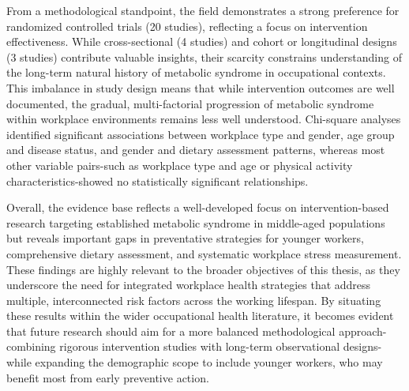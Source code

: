 From a methodological standpoint, the field demonstrates a strong preference for randomized controlled trials (20 studies), reflecting a focus on intervention effectiveness. While cross-sectional (4 studies) and cohort or longitudinal designs (3 studies) contribute valuable insights, their scarcity constrains understanding of the long-term natural history of metabolic syndrome in occupational contexts. This imbalance in study design means that while intervention outcomes are well documented, the gradual, multi-factorial progression of metabolic syndrome within workplace environments remains less well understood. Chi-square analyses identified significant associations between workplace type and gender, age group and disease status, and gender and dietary assessment patterns, whereas most other variable pairs-such as workplace type and age or physical activity characteristics-showed no statistically significant relationships.\par
Overall, the evidence base reflects a well-developed focus on intervention-based research targeting established metabolic syndrome in middle-aged populations but reveals important gaps in preventative strategies for younger workers, comprehensive dietary assessment, and systematic workplace stress measurement. These findings are highly relevant to the broader objectives of this thesis, as they underscore the need for integrated workplace health strategies that address multiple, interconnected risk factors across the working lifespan. By situating these results within the wider occupational health literature, it becomes evident that future research should aim for a more balanced methodological approach-combining rigorous intervention studies with long-term observational designs-while expanding the demographic scope to include younger workers, who may benefit most from early preventive action.


